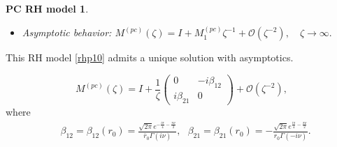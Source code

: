 \documentclass[11pt]{article}
\numberwithin{equation}{section}
\newtheorem{parabolic}{PC RH model}
\begin{document}
\begin{appendices}
\begin{parabolic}
\begin{itemize}
$$
M_{+}^{\left(pc \right)}(\zeta)=M_{-}^{\left(pc \right)}(\zeta) V^{(p c )}(\zeta), \quad \zeta \in \Sigma^{p c},
$$
where jump matrix is given by
$$
V^{(p c )}(\zeta)= \begin{cases}\zeta^{-i \nu \hat{\sigma}_3} e^{\frac{i \zeta^2}{4} \hat{\sigma}_3}\left(\begin{array}{cc}
1 & r_{0} \\
0 & 1
\end{array}\right), & \zeta \in \mathbb{R}_{+} e^{\phi i}; \\
\zeta^{-i \nu \hat{\sigma}_3} e^{\frac{i \zeta^2}{4} \hat{\sigma}_3}\left(\begin{array}{cc}
1 & 0 \\
\bar{r}_0 & 1
\end{array}\right), & \zeta \in \mathbb{R}_{+} e^{-\phi i};\\
\zeta^{-i \nu \hat{\sigma}_3} e^{\frac{i \zeta^2}{4} \hat{\sigma}_3}\left(\begin{array}{cc}
1 & -\frac{r_0}{1+\left|r_0\right|^2} \\
0 & 1
\end{array}\right), & \zeta \in \mathbb{R}_{+} e^{(\phi-\pi) i}; \\
\zeta^{-i \nu \hat{\sigma}_3} e^{\frac{i \zeta^2}{4} \hat{\sigma}_3}\left(\begin{array}{cc}
1 & 0 \\
-\frac{\bar{r}_{0}}{1+\left|r_0\right|^2} & 1
\end{array}\right), & \zeta \in \mathbb{R}_{+} e^{-(\phi-\pi) i};
\end{cases}
$$
\item Asymptotic behavior:
$M^{\left(pc \right)}(\zeta)=I+M_1^{\left(pc \right)} \zeta^{-1}+\mathcal{O}\left(\zeta^{-2}\right), \quad \zeta \rightarrow \infty.
$
\end{itemize}
\end{parabolic}
This  RH model  \ref{rhp10}  admits a unique solution with asymptotics.

\begin{equation}
    M^{\left(pc \right)}(\zeta)=I+\frac{1}{\zeta}\left(\begin{array}{cc}
0 & -i \beta_{12}  \\
 i \beta_{21}  & 0
\end{array}\right)+\mathcal{O}\left(\zeta^{-2}\right),
\end{equation}
where
\begin{align} &\beta_{12} =\beta_{12}(r_0)  =\frac{\sqrt{2 \pi} e^{ -\frac{  i \pi}{4} -\frac{  \pi \nu }{2}}}  {\bar{r}_{0} \Gamma\left(i \nu \right)}, \ \ \
  \beta_{21}   =\beta_{21}(r_0)  =-\frac{\sqrt{2 \pi} e^{  \frac{  i \pi}{4} -\frac{  \pi \nu }{2}}}  { {r}_{0} \Gamma\left(-i \nu \right)}.\label{eq24}
\end{align}






\end{appendices}
\end{document}
